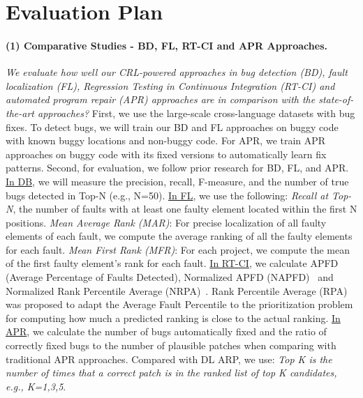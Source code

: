 \section{Evaluation Plan}
\label{eval}





\paragraph{{\bf (1) Comparative Studies - BD, FL, RT-CI and APR Approaches.}}
{\em We evaluate how well our CRL-powered approaches in bug
  detection (BD), fault localization (FL), Regression Testing in
  Continuous Integration (RT-CI) and automated program repair (APR)
  approaches are in comparison with the state-of-the-art approaches?}
First, we use the large-scale cross-language datasets with bug fixes.
To detect bugs, we will train our BD and FL approaches on buggy code
with known buggy locations and non-buggy code. For APR, we
train APR approaches on buggy code with its fixed versions to
automatically learn fix patterns. Second, for evaluation, we follow
prior research for BD, FL, and APR. \underline{In DB}, we will measure
the precision, recall, F-measure, and the number of true bugs detected
in Top-N (e.g., N=50). \underline{In FL}, we use the following:
\textit{Recall at Top-N}, the number of faults with at least one
faulty element located within the first N positions.  \textit{Mean
  Average Rank (MAR)}: For precise localization of all faulty elements
of each fault, we compute the average ranking of all the faulty
elements for each fault.  \textit{Mean First Rank (MFR)}: For each
project, we compute the mean of the first faulty element's rank for
each fault.  \underline{In RT-CI}, we calculate APFD (Average
Percentage of Faults Detected), Normalized APFD
(NAPFD)~\cite{qu2007combinatorial} and Normalized Rank Percentile
Average (NRPA)~\cite{bertolino2020learning}. Rank Percentile Average
(RPA) was proposed to adapt the Average Fault Percentile to the
prioritization problem for computing how much a predicted ranking is
close to the actual ranking.  \underline{In APR}, we calculate the
number of bugs automatically fixed and the ratio of correctly fixed
bugs to the number of plausible patches when comparing with
traditional APR approaches. Compared with DL ARP, we use: \textit{Top
  K is the number of times that a correct patch is in the ranked list
  of top K candidates, e.g., K=1,3,5}.

